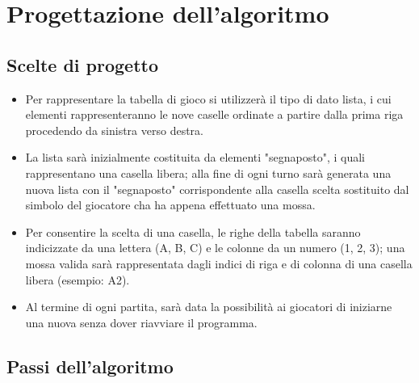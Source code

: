 \documentclass{article}
\begin{document}
\section{Progettazione dell'algoritmo}

\subsection{Scelte di progetto}

\begin{itemize}
    \item Per rappresentare la tabella di gioco si utilizzerà il tipo di dato lista, i cui elementi rappresenteranno le nove caselle ordinate a partire dalla prima riga procedendo da sinistra verso destra.
    \item La lista sarà inizialmente costituita da elementi "segnaposto", i quali rappresentano una casella libera; alla fine di ogni turno sarà generata una nuova lista con il "segnaposto" corrispondente alla casella scelta sostituito dal simbolo del giocatore cha ha appena effettuato una mossa.
    \item Per consentire la scelta di una casella, le righe della tabella saranno indicizzate da una lettera (A, B, C) e le colonne da un numero (1, 2, 3); una mossa valida sarà rappresentata dagli indici di riga e di colonna di una casella libera (esempio: A2).
    \item Al termine di ogni partita, sarà data la possibilità ai giocatori di iniziarne una nuova senza dover riavviare il programma.
\end{itemize}
\subsection{Passi dell'algoritmo}
\end{document}
